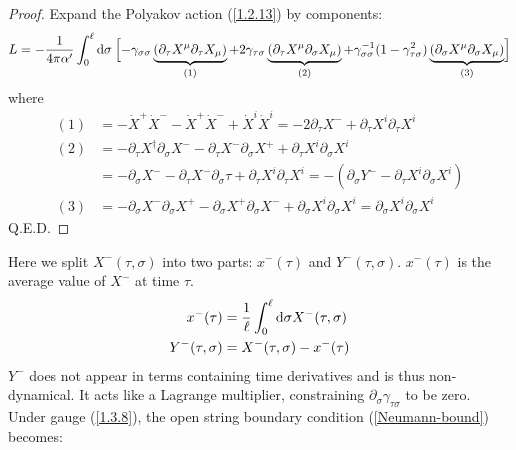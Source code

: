 \begin{tcolorbox}[breakable]
	\begin{proof}
		Expand the Polyakov action (\ref{1.2.13}) by components:
		\begin{align*}
			L=-\frac{1}{4 \pi \alpha^{\prime}} \int_{0}^{\ell} \mathrm{d}\sigma \:\Bigl[-\gamma_{\sigma \sigma}\underbrace{(\partial_\tau X^{\mu} \partial_\tau X_{\mu})}_{(1)} 
			+2 \gamma_{\tau \sigma}\underbrace{(\partial_{\tau} X^{\mu} \partial_{\sigma} X_{\mu})}_{(2)} 
			+\gamma_{\sigma \sigma}^{-1}(1-\gamma_{\tau \sigma}^{2}) \underbrace{(\partial_{\sigma} X^{\mu} \partial_{\sigma} X_{\mu})}_{(3)}\Bigr] 
		\end{align*}
		where
		\begin{align*}
			(1) &=-\dot{X}^{+} \dot{X}^{-}-\dot{X}^{+} \dot{X}^{-}+\dot{X}^{i} \dot{X}^{i} =-2 \partial_{\tau} X^{-}+\partial_{\tau} X^{i} \partial_{\tau} X^{i} \\
			(2) &=-\partial_{\tau} X^{\dagger} \partial_{\sigma} X^{-}-\partial_{\tau} X^{-} \partial_{\sigma} X^{+}+\partial_{\tau} X^{i} \partial_{\sigma} X^{i} \\
			&=-\partial_{\sigma} X^{-}-\partial_{\tau} X^{-} \partial_{\sigma} \tau+\partial_{\tau} X^{i} \partial_{\tau} X^{i} =-\left(\partial_{\sigma} Y^{-}-\partial_{\tau} X^{i} \partial_{\sigma} X^{i}\right) \\
			(3) &=-\partial_{\sigma} X^{-} \partial_{\sigma} X^{+}-\partial_{\sigma} X^{+} \partial_{\sigma} X^{-}+\partial_{\sigma} X^{i} \partial_{\sigma}X^{i} 
			=\partial_{\sigma} X^{i} \partial_{\sigma} X^{i}
		\end{align*}
		Q.E.D. 
	\end{proof}
\end{tcolorbox}
\noindent Here we split $X^-(\tau, \sigma)$ into two parts: $x^-(\tau)$ and $Y^-(\tau, \sigma)$. $x^-(\tau)$ is the average value of $X^-$ at time $\tau$. 
\begin{subequations}
	\begin{align}
		x^{-}(\tau)&=\frac{1}{\ell} \int_{0}^{\ell} \mathrm{d} \sigma X^{-}(\tau, \sigma) \\
		Y^{-}(\tau, \sigma)&=X^{-}(\tau, \sigma)-x^{-}(\tau)
	\end{align}
\end{subequations}
$Y^-$ does not appear in terms containing time derivatives and is thus non-dynamical. It acts like a Lagrange multiplier, constraining $\partial_\sigma \gamma_{\tau\sigma}$ to be zero. 
Under gauge (\ref{1.3.8}), the open string boundary condition (\ref{Neumann-bound}) becomes: 
